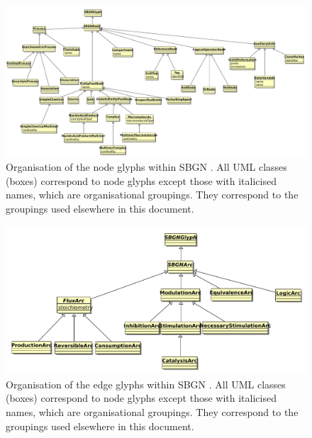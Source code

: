 \begin{figure}[htb]
\begin{center}
\includegraphics[width=0.6\linewidth]{images/sbgn_node_taxonomy}
\caption{Organisation of the node glyphs within SBGN \PDl. All UML classes (boxes) correspond to \PD node glyphs except those with italicised names, which are organisational groupings. They correspond to the groupings used elsewhere in this document.}
\label{fig:sbgn_node_tax}
\end{center}
\end{figure}

\begin{figure}[htb!]
\begin{center}
\includegraphics[width=\linewidth]{images/sbgn_edge_taxonomy}
\caption{Organisation of the edge glyphs within SBGN \PDl. All UML classes (boxes) correspond to \PD node glyphs except those with italicised names, which are organisational groupings. They correspond to the groupings used elsewhere in this document.}
\label{fig:sbgn_edge_tax}
\end{center}
\end{figure}


